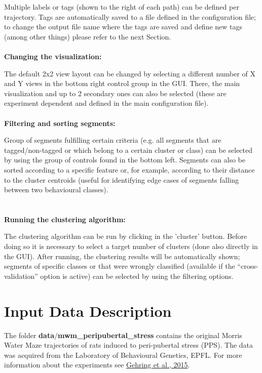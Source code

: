\documentclass[12pt,titlepage]{article}
\begin{document}
\begin{doublespace}
Multiple labels or tags (shown to the right of each path) can be defined per trajectory. Tags are automatically saved to a file defined in the configuration file; to change the output file name where the tags are saved and define new tags (among other things) please refer to the next Section.
\\
\\
\noindent\textbf{Changing the visualization:}

The default 2x2 view layout can be changed by selecting a different number of X and Y views in the bottom right control group in the GUI. There, the main visualization and up to 2 secondary ones can also be selected (these are experiment dependent and defined in the main configuration file).
\\
\\
\noindent\textbf{Filtering and sorting segments:}

Group of segments fulfilling certain criteria (e.g. all segments that are tagged/non-tagged or which belong to a certain cluster or class) can be selected by using the group of controls found in the bottom left. Segments can also be sorted according to a specific feature or, for example, according to their distance to the cluster centroids (useful for identifying edge cases of segments falling between two behavioural classes).
\\
\\
\\
\textbf{Running the clustering algorithm:}

The clustering algorithm can be run by clicking in the 'cluster' button. Before doing so it is necessary to select a target number of clusters (done also directly in the GUI). After running, the clustering results will be automatically shown; segments of specific classes or that were wrongly classified (available if the “cross-validation” option is active) can be selected by using the filtering options.


\section{Input Data Description}

The folder \textbf{data$/$mwm\_peripubertal\_stress} contains the original Morris Water Maze trajectories of rats induced to peri-pubertal stress (PPS). The data was acquired from the Laboratory of Behavioural Genetics, EPFL. For more information about the experiments see \href{http://www.nature.com/articles/srep14562}{Gehring et al., 2015}.


\end{doublespace}
\end{document}
